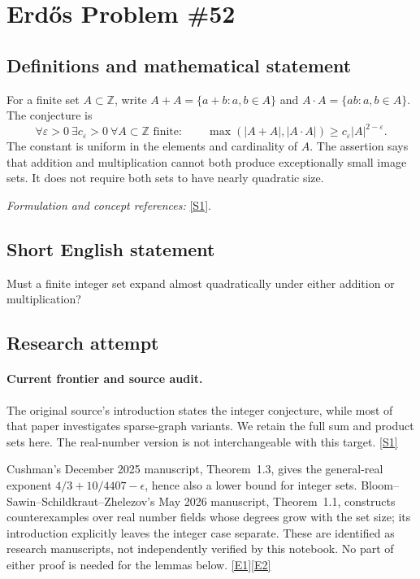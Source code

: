 \documentclass[11pt,a4paper]{article}
\newcommand{\Z}{\mathbb{Z}}
\newcommand{\sref}[2]{\hyperlink{source:#1:#2}{[S#2]}}
\newcommand{\eref}[2]{\hyperlink{extra:#1:#2}{[E#2]}}
\newif\ifshowcatalogue
\newcommand{\cataloguescope}[1]{\ifshowcatalogue
 \paragraph{Exact scope in the supplied catalogue.}
 \begin{quote}\small #1\end{quote}\fi}
\numberwithin{equation}{section}
\begin{document}
\setcounter{section}{0}
\clearpage
\section*{\texorpdfstring{Erdős Problem \#52}{Erdős Problem \#52}}\label{1904}
\subsection{Definitions and mathematical statement}
For a finite set $A\subset\Z$, write $A+A=\{a+b:a,b\in A\}$ and $A\cdot A=\{ab:a,b\in A\}$. The conjecture is
\[
 \forall\varepsilon>0\ \exists c_\varepsilon>0\ \forall A\subset\Z\text{ finite}:\qquad
 \max(|A+A|,|A\cdot A|)\ge c_\varepsilon|A|^{2-\varepsilon}.
\]
The constant is uniform in the elements and cardinality of $A$. The assertion says that addition and multiplication cannot both produce exceptionally small image sets. It does not require both sets to have nearly quadratic size.
\par\smallskip\textit{Formulation and concept references:} \sref{1904}{1}.
\cataloguescope{Prove that for every epsilon greater than zero there is a constant c\_epsilon greater than zero such that every finite set A of integers satisfies max(|A+A|, |A*A|) at least c\_epsilon times |A|\textasciicircum{}(2-epsilon).}
\subsection{Short English statement}
Must a finite integer set expand almost quadratically under either addition or multiplication?
\subsection{Research attempt}

\paragraph{Current frontier and source audit.}
The original source's introduction states the integer conjecture, while
most of that paper investigates sparse-graph variants. We retain the full
sum and product sets here. The real-number version is not interchangeable
with this target. \sref{1904}{1}

Cushman's December 2025 manuscript, Theorem~1.3, gives the general-real
exponent $4/3+10/4407-\epsilon$, hence also a lower bound for integer sets.
Bloom--Sawin--Schildkraut--Zhelezov's May 2026 manuscript, Theorem~1.1,
constructs counterexamples over real number fields whose degrees grow
with the set size; its introduction explicitly leaves the integer case
separate. These are identified as research manuscripts, not independently
verified by this notebook. No part of either proof is needed for the
lemmas below. \eref{1904}{1}\eref{1904}{2}
\end{document}
